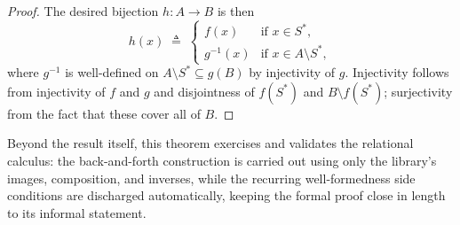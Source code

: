 \begin{proof}
  \noindent
  The desired bijection $h \colon A \to B$ is then
  \[
    h(x) \;\triangleq\;
    \begin{cases}
      f(x)      & \text{if } x \in S^*, \\
      g^{-1}(x) & \text{if } x \in A \setminus S^*,
    \end{cases}
  \]
  where $g^{-1}$ is well-defined on $A \setminus S^* \subseteq g(B)$ by injectivity of $g$.
  Injectivity follows from injectivity of $f$ and $g$ and disjointness of $f(S^*)$ and
  $B \setminus f(S^*)$; surjectivity from the fact that these cover all of $B$.
\end{proof}

\begin{remark}
  Beyond the result itself, this theorem exercises and validates the relational calculus: the back-and-forth construction is carried out using only the library's images, composition, and inverses, while the recurring well-formedness side conditions are discharged automatically, keeping the formal proof close in length to its informal statement.
\end{remark}

